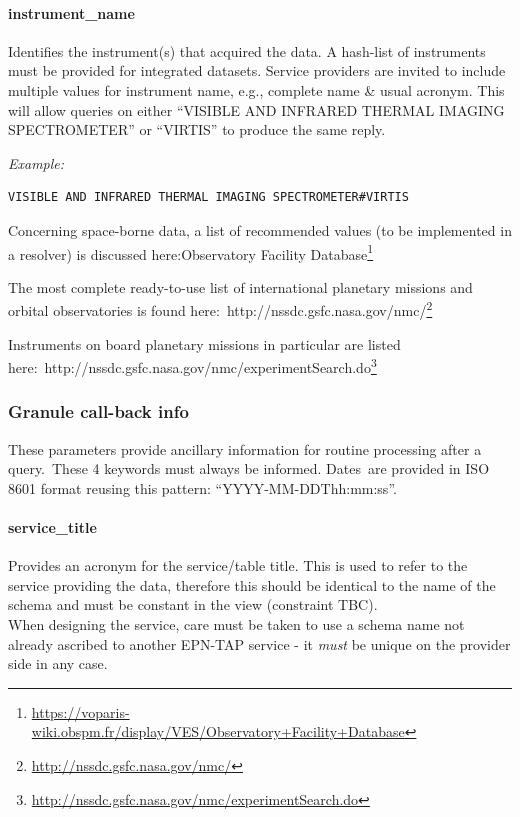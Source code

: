 \documentclass[11pt,a4paper]{ivoa}
\begin{document}
\paragraph{instrument\_name}

Identifies the instrument(s) that acquired the data. A hash-list of instruments must be provided for integrated datasets. Service providers are invited to include multiple values for instrument name, e.g., complete name \& usual acronym. This will allow queries on either ``VISIBLE AND INFRARED THERMAL IMAGING SPECTROMETER'' or ``VIRTIS'' to produce the same reply. 

\emph{\emph{Example:}}






\begin{verbatim}
VISIBLE AND INFRARED THERMAL IMAGING SPECTROMETER#VIRTIS
\end{verbatim}




Concerning space-borne data, a list of recommended values (to be implemented in a resolver) is discussed here:Observatory Facility Database\footnote{\url{https://voparis-wiki.obspm.fr/display/VES/Observatory+Facility+Database}}

The most complete ready-to-use list of international planetary missions and orbital observatories is found here: http://nssdc.gsfc.nasa.gov/nmc/\footnote{\url{http://nssdc.gsfc.nasa.gov/nmc/}}

Instruments on board planetary missions in particular are listed here: http://nssdc.gsfc.nasa.gov/nmc/experimentSearch.do\footnote{\url{http://nssdc.gsfc.nasa.gov/nmc/experimentSearch.do}}

\subsubsection{Granule call-back info}

These parameters provide ancillary information for routine processing after a query. These 4 keywords must always be informed. Dates are provided in ISO 8601 format reusing this pattern: “YYYY-MM-DDThh:mm:ss”. 

\paragraph{service\_title}

Provides an acronym for the service/table title. This is used to refer to the service providing the data, therefore this should be identical to the name of the schema and must be constant in the view (constraint TBC).\\When designing the service, care must be taken to use a schema name not already ascribed to another EPN-TAP service - it \emph{must} be unique on the provider side in any case.
\end{document}
